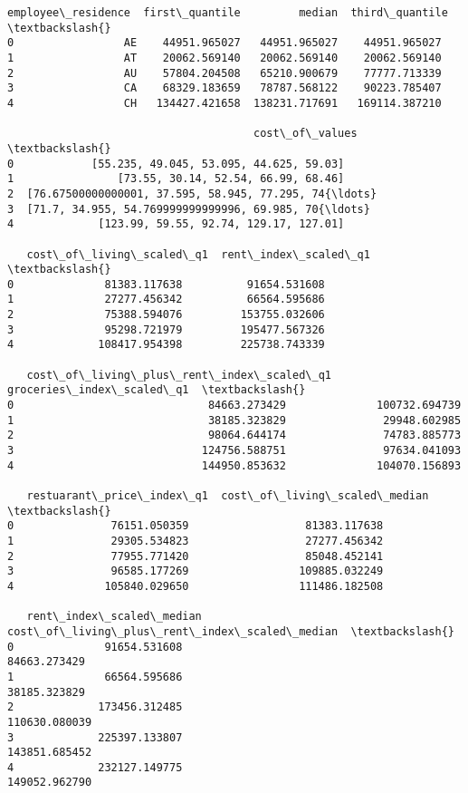 \documentclass[11pt]{article}
\begin{document}
    \begin{Verbatim}[commandchars=\\\{\}]
  employee\_residence  first\_quantile         median  third\_quantile  \textbackslash{}
0                 AE    44951.965027   44951.965027    44951.965027
1                 AT    20062.569140   20062.569140    20062.569140
2                 AU    57804.204508   65210.900679    77777.713339
3                 CA    68329.183659   78787.568122    90223.785407
4                 CH   134427.421658  138231.717691   169114.387210

                                      cost\_of\_values  \textbackslash{}
0            [55.235, 49.045, 53.095, 44.625, 59.03]
1                [73.55, 30.14, 52.54, 66.99, 68.46]
2  [76.67500000000001, 37.595, 58.945, 77.295, 74{\ldots}
3  [71.7, 34.955, 54.769999999999996, 69.985, 70{\ldots}
4             [123.99, 59.55, 92.74, 129.17, 127.01]

   cost\_of\_living\_scaled\_q1  rent\_index\_scaled\_q1  \textbackslash{}
0              81383.117638          91654.531608
1              27277.456342          66564.595686
2              75388.594076         153755.032606
3              95298.721979         195477.567326
4             108417.954398         225738.743339

   cost\_of\_living\_plus\_rent\_index\_scaled\_q1  groceries\_index\_scaled\_q1  \textbackslash{}
0                              84663.273429              100732.694739
1                              38185.323829               29948.602985
2                              98064.644174               74783.885773
3                             124756.588751               97634.041093
4                             144950.853632              104070.156893

   restuarant\_price\_index\_q1  cost\_of\_living\_scaled\_median  \textbackslash{}
0               76151.050359                  81383.117638
1               29305.534823                  27277.456342
2               77955.771420                  85048.452141
3               96585.177269                 109885.032249
4              105840.029650                 111486.182508

   rent\_index\_scaled\_median  cost\_of\_living\_plus\_rent\_index\_scaled\_median  \textbackslash{}
0              91654.531608                                  84663.273429
1              66564.595686                                  38185.323829
2             173456.312485                                 110630.080039
3             225397.133807                                 143851.685452
4             232127.149775                                 149052.962790


\end{Verbatim}
\end{document}
